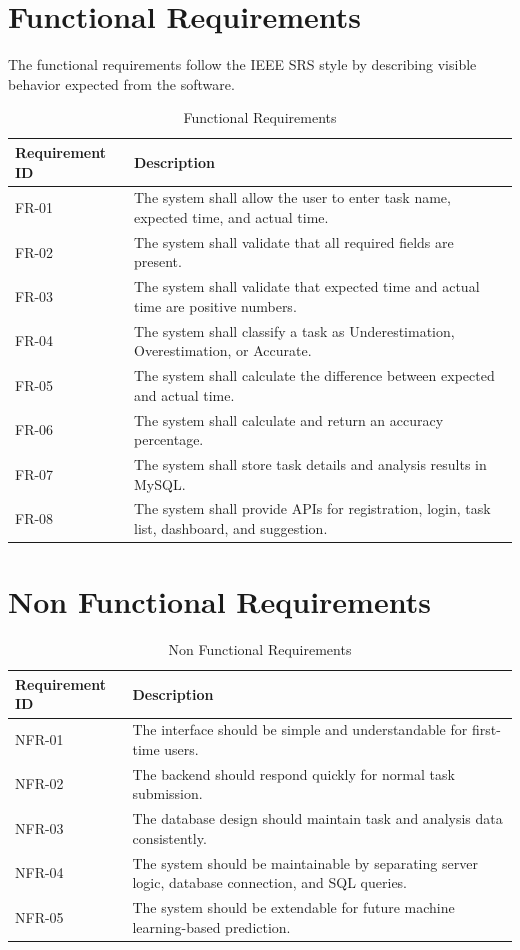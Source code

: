 \section{Functional Requirements}
\begin{justify}
The functional requirements follow the IEEE SRS style by describing visible behavior expected from the software.
\end{justify}

\begin{table}[H]
\centering
\begin{tabular}{|M|L|}
\hline
\textbf{Requirement ID} & \textbf{Description} \\
\hline
FR-01 & The system shall allow the user to enter task name, expected time, and actual time. \\
\hline
FR-02 & The system shall validate that all required fields are present. \\
\hline
FR-03 & The system shall validate that expected time and actual time are positive numbers. \\
\hline
FR-04 & The system shall classify a task as Underestimation, Overestimation, or Accurate. \\
\hline
FR-05 & The system shall calculate the difference between expected and actual time. \\
\hline
FR-06 & The system shall calculate and return an accuracy percentage. \\
\hline
FR-07 & The system shall store task details and analysis results in MySQL. \\
\hline
FR-08 & The system shall provide APIs for registration, login, task list, dashboard, and suggestion. \\
\hline
\end{tabular}
\caption{Functional Requirements}
\end{table}

\section{Non Functional Requirements}
\begin{table}[H]
\centering
\begin{tabular}{|M|L|}
\hline
\textbf{Requirement ID} & \textbf{Description} \\
\hline
NFR-01 & The interface should be simple and understandable for first-time users. \\
\hline
NFR-02 & The backend should respond quickly for normal task submission. \\
\hline
NFR-03 & The database design should maintain task and analysis data consistently. \\
\hline
NFR-04 & The system should be maintainable by separating server logic, database connection, and SQL queries. \\
\hline
NFR-05 & The system should be extendable for future machine learning-based prediction. \\
\hline
\end{tabular}
\caption{Non Functional Requirements}
\end{table}

